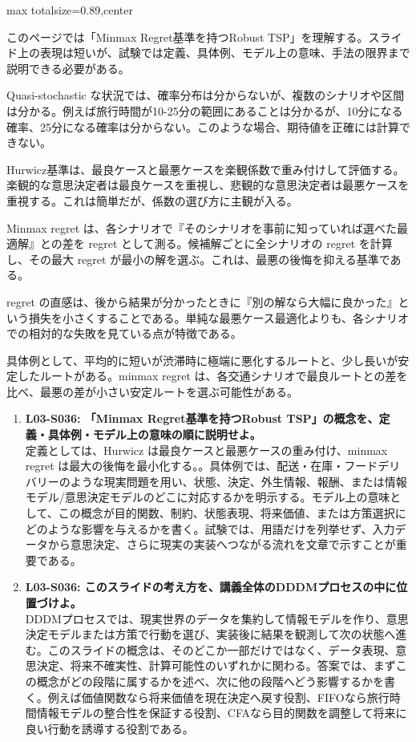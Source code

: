 \begin{minipage}[t]{0.58\textwidth}
\begin{adjustbox}{max totalsize={\textwidth}{0.89\textheight},center}
\begin{minipage}{\textwidth}\scriptsize
{}このページでは「Minmax Regret基準を持つRobust TSP」を理解する。スライド上の表現は短いが、試験では定義、具体例、モデル上の意味、手法の限界まで説明できる必要がある。\par
Quasi-stochastic な状況では、確率分布は分からないが、複数のシナリオや区間は分かる。例えば旅行時間が10-25分の範囲にあることは分かるが、10分になる確率、25分になる確率は分からない。このような場合、期待値を正確には計算できない。\par
Hurwicz基準は、最良ケースと最悪ケースを楽観係数で重み付けして評価する。楽観的な意思決定者は最良ケースを重視し、悲観的な意思決定者は最悪ケースを重視する。これは簡単だが、係数の選び方に主観が入る。\par
Minmax regret は、各シナリオで『そのシナリオを事前に知っていれば選べた最適解』との差を regret として測る。候補解ごとに全シナリオの regret を計算し、その最大 regret が最小の解を選ぶ。これは、最悪の後悔を抑える基準である。\par
regret の直感は、後から結果が分かったときに『別の解なら大幅に良かった』という損失を小さくすることである。単純な最悪ケース最適化よりも、各シナリオでの相対的な失敗を見ている点が特徴である。\par
具体例として、平均的に短いが渋滞時に極端に悪化するルートと、少し長いが安定したルートがある。minmax regret は、各交通シナリオで最良ルートとの差を比べ、最悪の差が小さい安定ルートを選ぶ可能性がある。\par{}\begin{enumerate}\item \textbf{L03-S036: 「Minmax Regret基準を持つRobust TSP」の概念を、定義・具体例・モデル上の意味の順に説明せよ。}\\定義としては、Hurwicz は最良ケースと最悪ケースの重み付け、minmax regret は最大の後悔を最小化する。。具体例では、配送・在庫・フードデリバリーのような現実問題を用い、状態、決定、外生情報、報酬、または情報モデル/意思決定モデルのどこに対応するかを明示する。モデル上の意味として、この概念が目的関数、制約、状態表現、将来価値、または方策選択にどのような影響を与えるかを書く。試験では、用語だけを列挙せず、入力データから意思決定、さらに現実の実装へつながる流れを文章で示すことが重要である。\item \textbf{L03-S036: このスライドの考え方を、講義全体のDDDMプロセスの中に位置づけよ。}\\DDDMプロセスでは、現実世界のデータを集約して情報モデルを作り、意思決定モデルまたは方策で行動を選び、実装後に結果を観測して次の状態へ進む。このスライドの概念は、そのどこか一部だけではなく、データ表現、意思決定、将来不確実性、計算可能性のいずれかに関わる。答案では、まずこの概念がどの段階に属するかを述べ、次に他の段階へどう影響するかを書く。例えば価値関数なら将来価値を現在決定へ戻す役割、FIFOなら旅行時間情報モデルの整合性を保証する役割、CFAなら目的関数を調整して将来に良い行動を誘導する役割である。\end{enumerate}

\end{minipage}
\end{adjustbox}
\end{minipage}
